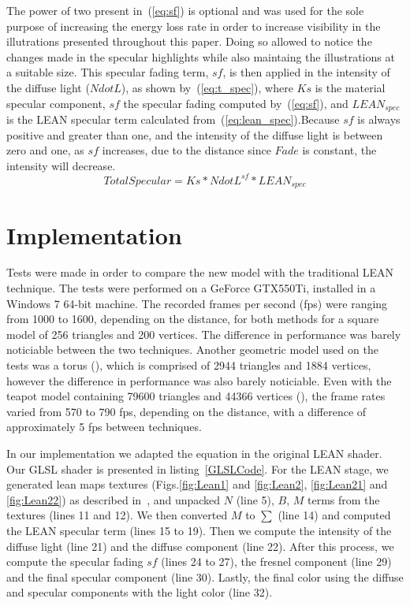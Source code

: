\documentclass[10pt, conference]{IEEEtran}
\begin{document}
The power of two present in~(\ref{eq:sf}) is optional and was used for the sole purpose of increasing the energy loss rate in order to increase visibility in the illutrations presented throughout this paper. Doing so allowed to notice the changes made in the specular highlights while also maintaing the illustrations at a suitable size. This specular fading term, $sf$, is then applied in the intensity of the diffuse light ($NdotL$), as shown by~(\ref{eq:t_spec}), where $Ks$ is the material specular component, $sf$ the specular fading computed by~(\ref{eq:sf}), and $LEAN_{spec}$ is the LEAN specular term calculated from~(\ref{eq:lean_spec}).Because $sf$ is always positive and greater than one, and the intensity of the diffuse light is between zero and one, as $sf$ increases, due to the distance since $Fade$ is constant, the intensity will decrease.
\begin{equation}
	\label{eq:t_spec}
	TotalSpecular = Ks * NdotL^{sf} * LEAN_{spec}
\end{equation}


\section{Implementation}
\label{sec:implementation}

Tests were made in order to compare the new model with the traditional LEAN technique. The tests were performed on a GeForce GTX550Ti, installed in a Windows 7 64-bit machine. The recorded frames per second (fps) were ranging from 1000 to 1600, depending on the distance, for both methods for a square model of 256 triangles and 200 vertices. The difference in performance was barely noticiable between the two techniques. Another geometric model used on the tests was a torus (), which is comprised of 2944 triangles and 1884 vertices, however the difference in performance was also barely noticiable. Even with the teapot model containing 79600 triangles and 44366 vertices (), the frame rates varied from 570 to 790 fps, depending on the distance, with a difference of approximately 5 fps between techniques.

In our implementation we adapted the equation in the original LEAN shader. Our GLSL shader is presented in listing~\ref{GLSLCode}. For the LEAN stage, we generated lean maps textures (Figs.\ref{fig:Lean1} and \ref{fig:Lean2}, \ref{fig:Lean21} and \ref{fig:Lean22}) as described in~\cite{Olano:2010:LM:1730804.1730834}, and unpacked $N$ (line 5), $B$, $M$ terms from the textures (lines 11 and 12). We then converted $M$ to $∑$ (line 14) and computed the LEAN specular term (lines 15 to 19). Then we compute the intensity of the diffuse light (line 21) and the diffuse component (line 22). After this process, we compute the specular fading $sf$ (lines 24 to 27), the fresnel component (line 29) and the final specular component (line 30). Lastly, the final color using the diffuse and specular components with the light color (line 32).
\end{document}
